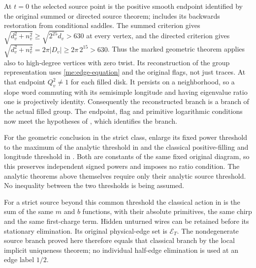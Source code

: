 At $t=0$ the selected source point is the positive smooth endpoint
identified by the original summed or directed source theorem;
\cite[Section 7.6]{CircleTree} includes its backwards restoration from
conditional saddles. The summed criterion gives
$\sqrt{d_v^2+n_v^2}\ge\sqrt{2^{25}d_v}>630$ at every vertex,
and the directed criterion gives
$\sqrt{d_v^2+n_v^2}=2\pi|D_v|\ge2\pi\,2^{15}>630$.
Thus the marked geometric theorem applies also to high-degree
vertices with zero twist. Its reconstruction of the group representation uses
\eqref{me:edge-equation} and the original flags, not just traces.
At that endpoint $Q_v^2\ne1$ for each filled disk. It persists on
a neighborhood, so a slope word commuting with its semisimple
longitude and having eigenvalue ratio one is projectively identity.
Consequently the reconstructed branch is a branch of the actual
filled group. The endpoint, flag and primitive logarithmic
conditions now meet the hypotheses of
\cite[Corollary 7.1]{Nonparabolic}, which identifies the branch.

For the geometric conclusion in the strict class, enlarge its
fixed power threshold to the maximum of the analytic threshold in
\cite[Theorem 1.2]{MovingSources} and the classical positive-filling
and longitude threshold in \cite[Theorem 1.3]{Longitudes}. Both
are constants of the same fixed original diagram, so this preserves
independent signed powers and imposes no ratio condition. The
analytic theorems above themselves require only their analytic
source threshold. No inequality between the two thresholds is
being assumed.

For a strict source beyond this common threshold the classical action in
\cite[Theorem 1.3]{Longitudes} is the sum of the same $m$ and $b$
functions, with their absolute primitives, the same chirp and the
same first-charge term. Hidden unturned wires can be retained
before its stationary elimination. Its original physical-edge
set is $\mathcal E_T$. The nondegenerate source branch proved
here therefore equals that classical branch by the local implicit
uniqueness theorem; no individual half-edge elimination is used
at an edge label $1/2$.


